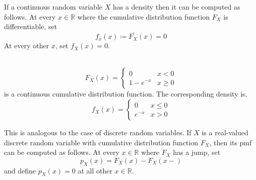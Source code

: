 If a continuous random variable $X$ has a density then it can be computed as
follows. At every $x \in \mathbb{R}$ where the cumulative distribution
function $F_X$ is differentiable, set
\[
    f_x(x) \coloneqq F_X^\prime(x) = 0
\]
At every other $x$, set $f_X(x) = 0$.
\begin{example} \quad                                                        \\
\[
    F_X(x) = \begin{cases}
        0               & x < 0                                              \\
        1 - e^{-x}      & x \geq 0
    \end{cases}
\]
is a continuous cumulative distribution function. The corresponding density is,
\[
    f_X(x) = \begin{cases}
        0               & x \leq 0                                           \\
        e^{-x}          & x > 0
    \end{cases}
\]
\end{example}

This is analogous to the case of discrete random variables. If $X$ is a
real-valued discrete random variable with cumulative distribution function
$F_X$, then its pmf can be computed as follows. At every $x \in \mathbb{R}$
where $F_X$ has a jump, set
\[
    p_X(x) = F_X(x) - F_X(x-)
\]
and define $p_X(x) = 0$ at all other $x \in \mathbb{R}$.